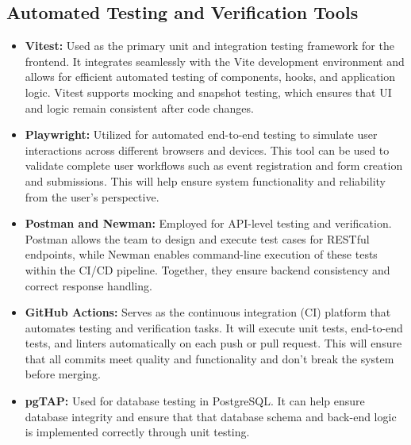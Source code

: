 \documentclass[12pt, titlepage]{article}
\begin{document}


\subsection{Automated Testing and Verification Tools}

\begin{itemize}
    \item \textbf{Vitest:} Used as the primary unit and integration testing framework for the frontend. It integrates seamlessly with the Vite development environment and allows for efficient automated testing of components, hooks, and application logic. Vitest supports mocking and snapshot testing, which ensures that UI and logic remain consistent after code changes.

    \item \textbf{Playwright:} Utilized for automated end-to-end testing to simulate user interactions across different browsers and devices. This tool can be used to validate complete user workflows such as event registration and form creation and submissions. This will help ensure system functionality and reliability from the user's perspective.

    \item \textbf{Postman and Newman:} Employed for API-level testing and verification. Postman allows the team to design and execute test cases for RESTful endpoints, while Newman enables command-line execution of these tests within the CI/CD pipeline. Together, they ensure backend consistency and correct response handling.

    \item \textbf{GitHub Actions:} Serves as the continuous integration (CI) platform that automates testing and verification tasks. It will execute unit tests, end-to-end tests, and linters automatically on each push or pull request. This will ensure that all commits meet quality and functionality and don't break the system before merging.

    \item \textbf{pgTAP:} Used for database testing in PostgreSQL. It can help ensure database integrity and ensure that that database schema and back-end logic is implemented correctly through unit testing.
\end{itemize}
\end{document}
